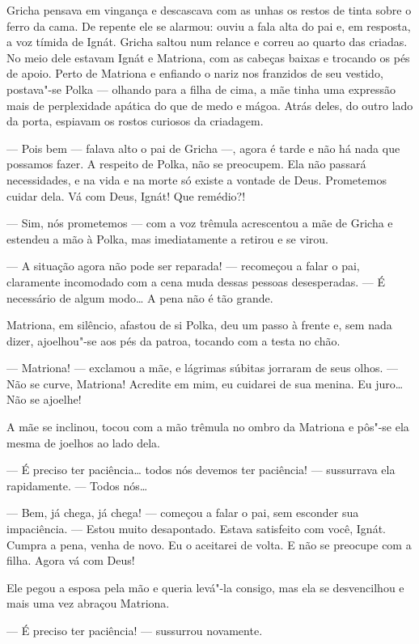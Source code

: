 Gricha pensava em vingança e descascava com as unhas os restos de tinta
sobre o ferro da cama. De repente ele se alarmou: ouviu a fala alta do
pai e, em resposta, a voz tímida de Ignát. Gricha saltou num relance e
correu ao quarto das criadas. No meio dele estavam Ignát e Matriona, com
as cabeças baixas e trocando os pés de apoio. Perto de Matriona e
enfiando o nariz nos franzidos de seu vestido, postava"-se Polka ---
olhando para a filha de cima, a mãe tinha uma expressão mais de
perplexidade apática do que de medo e mágoa. Atrás deles, do outro lado
da porta, espiavam os rostos curiosos da criadagem.

--- Pois bem --- falava alto o pai de Gricha ---, agora é tarde e não há
nada que possamos fazer. A respeito de Polka, não se preocupem. Ela não
passará necessidades, e na vida e na morte só existe a vontade de Deus.
Prometemos cuidar dela. Vá com Deus, Ignát! Que remédio?!

--- Sim, nós prometemos --- com a voz trêmula acrescentou a mãe de
Gricha e estendeu a mão à Polka, mas imediatamente a retirou e se virou.

--- A situação agora não pode ser reparada! --- recomeçou a falar o pai,
claramente incomodado com a cena muda dessas pessoas desesperadas. --- É
necessário de algum modo\ldots{} A pena não é tão grande.

Matriona, em silêncio, afastou de si Polka, deu um passo à frente e, sem
nada dizer, ajoelhou"-se aos pés da patroa, tocando com a testa no chão.

--- Matriona! --- exclamou a mãe, e lágrimas súbitas jorraram de seus
olhos. --- Não se curve, Matriona! Acredite em mim, eu cuidarei de sua
menina. Eu juro\ldots{} Não se ajoelhe!

A mãe se inclinou, tocou com a mão trêmula no ombro da Matriona e pôs"-se
ela mesma de joelhos ao lado dela.

--- É preciso ter paciência\ldots{} todos nós devemos ter paciência! ---
sussurrava ela rapidamente. --- Todos nós\ldots{}

--- Bem, já chega, já chega! --- começou a falar o pai, sem esconder sua
impaciência. --- Estou muito desapontado. Estava satisfeito com você,
Ignát. Cumpra a pena, venha de novo. Eu o aceitarei de volta. E não se
preocupe com a filha. Agora vá com Deus!

Ele pegou a esposa pela mão e queria levá"-la consigo, mas ela se
desvencilhou e mais uma vez abraçou Matriona.

--- É preciso ter paciência! --- sussurrou novamente.

